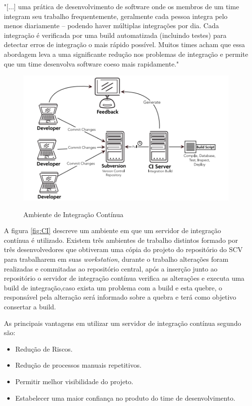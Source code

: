 \begin{citacao}
"[...] uma prática de desenvolvimento de software onde os membros de um time integram seu trabalho frequentemente, geralmente cada pessoa integra pelo menos diariamente – podendo haver múltiplas integrações por dia. Cada integração é verificada por uma build automatizada (incluindo testes) para detectar erros de integração o mais rápido possível. Muitos times acham que essa abordagem leva a uma significante redução nos problemas de integração e permite que um time desenvolva software coeso mais rapidamente." 
\end{citacao}

\begin{figure}[tbh]
\centering
\caption[Ambiente de Integração Contínua]{Ambiente de Integração Contínua}
\includegraphics[width=0.8\linewidth]{./images/CI}
\label{fig:CI}
\end{figure}

A figura \autoref{fig:CI} descreve um ambiente em que um servidor de integração contínua é utilizado. Existem três ambientes de trabalho distintos formado por três desenvolvedores que obtiveram uma cópia do projeto do repositório do SCV para trabalharem em suas \textit{workstation}, durante o trabalho alterações foram realizadas e commitadas ao repositório central, após a inserção junto ao repositório o servidor de integração contínua verifica as alterações e executa uma build de integração,caso exista um problema com a build e esta quebre, o responsável pela alteração será informado sobre a quebra e terá como objetivo consertar a build.

As principais vantagens em utilizar um servidor de integração contínua segundo  são:

\begin{itemize}
\item Redução de Riscos.
\item Redução de processos manuais repetitivos.
\item Permitir melhor visibilidade do projeto.
\item Estabelecer uma maior confiança no produto do time de desenvolvimento.
\end{itemize}

